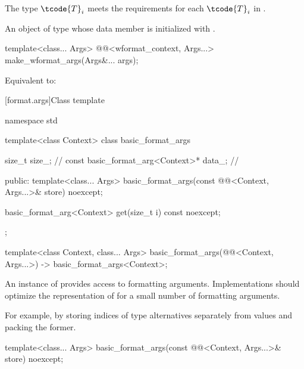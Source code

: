 \begin{itemdescr}
\pnum
\expects
The type
$\tcode{T}_i$\tcode{>>}\linebreak{}
meets the  requirements
for each $\tcode{T}_i$ in .

\pnum
\returns
An object of type 
whose  data member is initialized with
.
\end{itemdescr}

%
\begin{itemdecl}
template<class... Args>
  @@<wformat_context, Args...> make_wformat_args(Args&... args);
\end{itemdecl}

\begin{itemdescr}
\pnum
\effects
Equivalent to:
\end{itemdescr}

[format.args]{Class template }

\begin{codeblock}
namespace std {
  template<class Context>
  class basic_format_args {
    size_t size_;                               // \expos
    const basic_format_arg<Context>* data_;     // \expos

  public:
    template<class... Args>
      basic_format_args(const @@<Context, Args...>& store) noexcept;

    basic_format_arg<Context> get(size_t i) const noexcept;
  };

  template<class Context, class... Args>
    basic_format_args(@@<Context, Args...>) -> basic_format_args<Context>;
}
\end{codeblock}

\pnum
An instance of  provides access to formatting
arguments.
Implementations should
optimize the representation of 
for a small number of formatting arguments.
\begin{note}
For example, by storing indices of type alternatives separately from values
and packing the former.
\end{note}

%
\begin{itemdecl}
template<class... Args>
  basic_format_args(const @@<Context, Args...>& store) noexcept;
\end{itemdecl}


